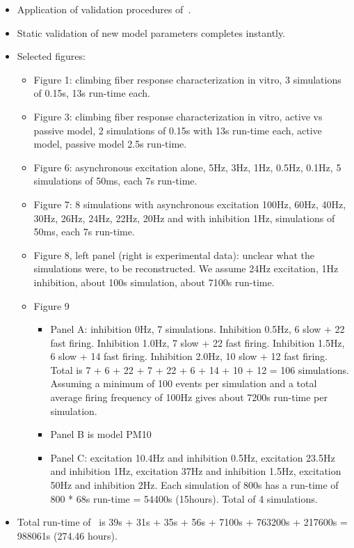 \documentclass[12pt]{article}
\begin{document}
\begin{itemize}
\begin{itemize}
  \item Application of validation procedures
    of~\cite{De-Schutter-E:1994vn}.
  \item Static validation of new model parameters completes instantly.
  \item Selected figures:
    \begin{itemize}
    \item Figure 1: climbing fiber response characterization in vitro,
      3 simulations of 0.15s, 13s run-time each.
    \item Figure 3: climbing fiber response characterization in vitro,
      active vs passive model, 2 simulations of 0.15s with 13s
      run-time each, active model, passive model 2.5s run-time.
    \item Figure 6: asynchronous excitation alone, 5Hz, 3Hz, 1Hz, 0.5Hz,
      0.1Hz, 5 simulations of 50ms, each 7s run-time.
    \item Figure 7: 8 simulations with asynchronous excitation 100Hz,
      60Hz, 40Hz, 30Hz, 26Hz, 24Hz, 22Hz, 20Hz and with inhibition
      1Hz, simulations of 50ms, each 7s run-time.
    \item Figure 8, left panel (right is experimental data): unclear
      what the simulations were, to be reconstructed.  We assume 24Hz
      excitation, 1Hz inhibition, about 100s simulation, about 7100s
      run-time.
    \item Figure 9
      \begin{itemize}
      \item Panel A: inhibition 0Hz, 7 simulations.  Inhibition 0.5Hz,
        6 slow + 22 fast firing.  Inhibition 1.0Hz, 7 slow + 22 fast
        firing.  Inhibition 1.5Hz, 6 slow + 14 fast firing.
        Inhibition 2.0Hz, 10 slow + 12 fast firing.  Total is 7 + 6 +
        22 + 7 + 22 + 6 + 14 + 10 + 12 = 106 simulations.  Assuming a
        minimum of 100 events per simulation and a total average
        firing frequency of 100Hz gives about 7200s run-time per
        simulation.
      \item Panel B is model PM10
      \item Panel C: excitation 10.4Hz and inhibition 0.5Hz,
        excitation 23.5Hz and inhibition 1Hz, excitation 37Hz and
        inhibition 1.5Hz, excitation 50Hz and inhibition 2Hz.  Each
        simulation of 800s has a run-time of 800 * 68s run-time =
        54400s (15hours).  Total of 4 simulations.
      \end{itemize}
    \end{itemize}
  \item Total run-time of~\cite{E:1994hc} is 39s + 31s + 35s + 56s +
    7100s + 763200s + 217600s = 988061s (274.46 hours).



\end{itemize}
\end{itemize}
\end{document}
